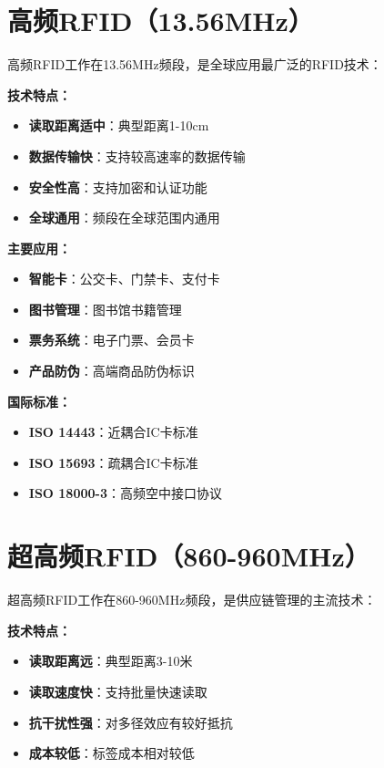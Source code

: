 \documentclass[12pt,UTF8]{ctexbook}
\begin{document}
\begin{itemize}[leftmargin=3.5em]
\section{高频RFID（13.56MHz）}

高频RFID工作在13.56MHz频段，是全球应用最广泛的RFID技术：

\textbf{技术特点：}
\begin{itemize}[leftmargin=3.5em]
    \item \textbf{读取距离适中}：典型距离1-10cm
    \item \textbf{数据传输快}：支持较高速率的数据传输
    \item \textbf{安全性高}：支持加密和认证功能
    \item \textbf{全球通用}：频段在全球范围内通用
\end{itemize}

\textbf{主要应用：}
\begin{itemize}[leftmargin=3.5em]
    \item \textbf{智能卡}：公交卡、门禁卡、支付卡
    \item \textbf{图书管理}：图书馆书籍管理
    \item \textbf{票务系统}：电子门票、会员卡
    \item \textbf{产品防伪}：高端商品防伪标识
\end{itemize}

\textbf{国际标准：}
\begin{itemize}[leftmargin=3.5em]
    \item \textbf{ISO 14443}：近耦合IC卡标准
    \item \textbf{ISO 15693}：疏耦合IC卡标准
    \item \textbf{ISO 18000-3}：高频空中接口协议
\end{itemize}

\section{超高频RFID（860-960MHz）}

超高频RFID工作在860-960MHz频段，是供应链管理的主流技术：

\textbf{技术特点：}
\begin{itemize}[leftmargin=3.5em]
    \item \textbf{读取距离远}：典型距离3-10米
    \item \textbf{读取速度快}：支持批量快速读取
    \item \textbf{抗干扰性强}：对多径效应有较好抵抗
    \item \textbf{成本较低}：标签成本相对较低
\end{itemize}


\end{itemize}
\end{document}
